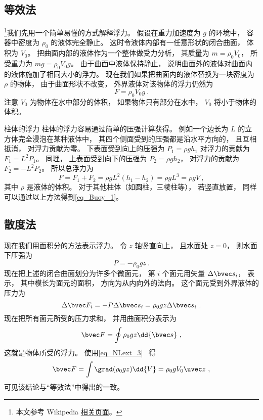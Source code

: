 
\subsection{等效法}

\footnote{本文参考 Wikipedia \href{https://en.wikipedia.org/wiki/Archimedes'_principle}{相关页面}。}我们先用一个简单易懂的方式解释浮力。 假设在重力加速度为 $g$ 的环境中， 容器中密度为 $\rho_0$ 的液体完全静止。 这时令液体内部有一任意形状的闭合曲面， 体积为 $V_0$。 把曲面内部的液体作为一个整体做受力分析， 其质量为 $m = \rho_0 V_0$， 所受重力为 $mg = \rho_0 V_0 g$。 由于曲面中液体保持静止， 说明曲面外的液体对曲面内的液体施加了相同大小的浮力。 现在我们如果把曲面内的液体替换为一块密度为 $\rho$ 的物体， 由于曲面形状不改变， 外界液体对该物体的浮力仍然为
\begin{equation}\label{eq_Buoy_1}
F = \rho_0 V_0 g~.
\end{equation}
注意 $V_0$ 为物体在水中部分的体积， 如果物体只有部分在水中， $V_0$ 将小于物体的体积。

\begin{example}{柱体的浮力}
柱体的浮力容易通过简单的压强计算获得。 例如一个边长为 $L$ 的立方体完全浸泡在某种液体中， 其四个侧面受到的压强都是沿水平方向的， 且互相抵消， 对浮力贡献为零。 下表面受到向上的压强为 $P_1 = \rho g h_1$ 对浮力的贡献为 $F_1 = L^2 P_1$。 同理， 上表面受到向下的压强为 $P_2 = \rho g h_2$， 对浮力的贡献为 $F_2 = -L^2 P_2$。 所以总浮力为
\begin{equation}
F = F_1 + F_2 = \rho g L^2 (h_1 - h_2) = \rho g L^3 = \rho g V~,
\end{equation}
其中 $\rho$ 是液体的体积。 对于其他柱体（如圆柱，三棱柱等）， 若竖直放置， 同样可以通过以上方法得到\autoref{eq_Buoy_1}。
\end{example}

\subsection{散度法}

现在我们用面积分的方法表示浮力。 令 $z$ 轴竖直向上， 且水面处 $z = 0$， 则水面下压强为
\begin{equation}
P = -\rho_0 g z~.
\end{equation}
现在把上述的闭合曲面划分为许多个微面元， 第 $i$ 个面元用矢量 $\Delta \bvec s_i$， 表示， 其中模长为面元的面积， 方向为从内向外的法向。 这个面元受到外界液体的压力为
\begin{equation}
\Delta \bvec F_i = -P\Delta \bvec s_i = \rho_0 g z \Delta \bvec s_i~.
\end{equation}
现在把所有面元所受的压力求和， 并用曲面积分表示为
\begin{equation}
\bvec F = \oint \rho_0 g z \dd{\bvec s}~,
\end{equation}
这就是物体所受的浮力。 使用\autoref{eq_NLext_3}~ 得
\begin{equation}
\bvec F = \int \grad(\rho_0 g z) \dd{V} = \rho_0 g V_0 \uvec z~,
\end{equation}
可见该结论与“等效法”中得出的一致。
